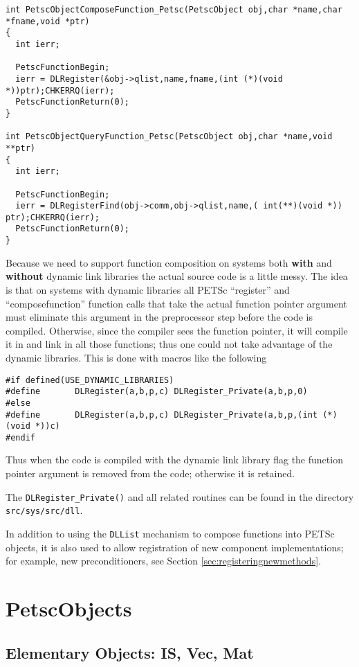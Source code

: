 \begin{verbatim}
int PetscObjectComposeFunction_Petsc(PetscObject obj,char *name,char *fname,void *ptr)
{
  int ierr;

  PetscFunctionBegin;
  ierr = DLRegister(&obj->qlist,name,fname,(int (*)(void *))ptr);CHKERRQ(ierr);
  PetscFunctionReturn(0);
}

int PetscObjectQueryFunction_Petsc(PetscObject obj,char *name,void **ptr)
{
  int ierr;

  PetscFunctionBegin;
  ierr = DLRegisterFind(obj->comm,obj->qlist,name,( int(**)(void *)) ptr);CHKERRQ(ierr);
  PetscFunctionReturn(0);
}
\end{verbatim}

  Because we need to support function composition on systems both {\bf with} and {\bf without} 
dynamic link libraries the actual source code is a little messy. The idea is that
on systems with dynamic libraries all PETSc ``register'' and ``composefunction''
function calls that take the actual 
function pointer argument must eliminate this argument in the preprocessor step before 
the code is compiled. Otherwise, since the compiler sees the function pointer, it will 
compile it in and link in all those functions; thus one could not take advantage of the
dynamic libraries. This is done with macros like the following
\begin{verbatim}
#if defined(USE_DYNAMIC_LIBRARIES)
#define       DLRegister(a,b,p,c) DLRegister_Private(a,b,p,0)
#else
#define       DLRegister(a,b,p,c) DLRegister_Private(a,b,p,(int (*)(void *))c)
#endif
\end{verbatim}
Thus when the code is compiled with the dynamic link library flag the function pointer 
argument is removed from the code; otherwise it is retained. 

The {\tt DLRegister\_Private()} and all related routines can be found in the directory
{\tt src/sys/src/dll}.

In addition to using the {\tt DLList} mechanism to compose functions into PETSc objects, it is
also used to allow registration of new component implementations; for example, new
preconditioners, see Section \ref{sec:registeringnewmethods}. 


\chapter{PetscObjects}

\section{Elementary Objects: IS, Vec, Mat}

